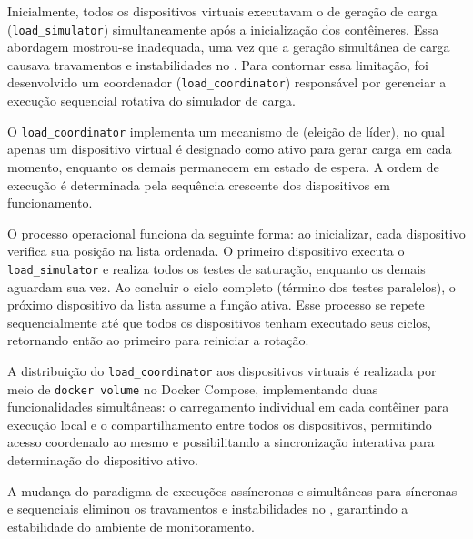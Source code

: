 {\color{red}
Inicialmente, todos os dispositivos virtuais executavam o  de geração de carga (\verb|load_simulator|) simultaneamente após a inicialização dos contêineres. Essa abordagem mostrou-se inadequada, uma vez que a geração simultânea de carga causava travamentos e instabilidades no . Para contornar essa limitação, foi desenvolvido um  coordenador (\verb|load_coordinator|) responsável por gerenciar a execução sequencial rotativa do simulador de carga.

O \verb|load_coordinator| implementa um mecanismo de  (eleição de líder), no qual apenas um dispositivo virtual é designado como ativo para gerar carga em cada momento, enquanto os demais permanecem em estado de espera. A ordem de execução é determinada pela sequência crescente dos dispositivos em funcionamento.

O processo operacional funciona da seguinte forma: ao inicializar, cada dispositivo verifica sua posição na lista ordenada. O primeiro dispositivo executa o \verb|load_simulator| e realiza todos os testes de saturação, enquanto os demais aguardam sua vez. Ao concluir o ciclo completo (término dos testes paralelos), o próximo dispositivo da lista assume a função ativa. Esse processo se repete sequencialmente até que todos os dispositivos tenham executado seus ciclos, retornando então ao primeiro para reiniciar a rotação.

A distribuição do \verb|load_coordinator| aos dispositivos virtuais é realizada por meio de \verb|docker volume| no Docker Compose, implementando duas funcionalidades simultâneas: o carregamento individual em cada contêiner para execução local e o compartilhamento entre todos os dispositivos, permitindo acesso coordenado ao mesmo  e possibilitando a sincronização interativa para determinação do dispositivo ativo.

A mudança do paradigma de execuções assíncronas e simultâneas para síncronas e sequenciais eliminou os travamentos e instabilidades no , garantindo a estabilidade do ambiente de monitoramento.
}

